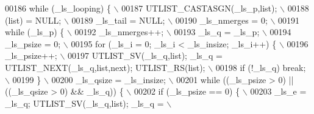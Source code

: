 \begin{DoxyCode}
00186 \textcolor{preprocessor}{    while (\_ls\_looping) \{                                                                      \(\backslash\)}
00187 \textcolor{preprocessor}{      UTLIST\_CASTASGN(\_ls\_p,list);                                                             \(\backslash\)}
00188 \textcolor{preprocessor}{      (list) = NULL;                                                                           \(\backslash\)}
00189 \textcolor{preprocessor}{      \_ls\_tail = NULL;                                                                         \(\backslash\)}
00190 \textcolor{preprocessor}{      \_ls\_nmerges = 0;                                                                         \(\backslash\)}
00191 \textcolor{preprocessor}{      while (\_ls\_p) \{                                                                          \(\backslash\)}
00192 \textcolor{preprocessor}{        \_ls\_nmerges++;                                                                         \(\backslash\)}
00193 \textcolor{preprocessor}{        \_ls\_q = \_ls\_p;                                                                         \(\backslash\)}
00194 \textcolor{preprocessor}{        \_ls\_psize = 0;                                                                         \(\backslash\)}
00195 \textcolor{preprocessor}{        for (\_ls\_i = 0; \_ls\_i < \_ls\_insize; \_ls\_i++) \{                                         \(\backslash\)}
00196 \textcolor{preprocessor}{          \_ls\_psize++;                                                                         \(\backslash\)}
00197 \textcolor{preprocessor}{          UTLIST\_SV(\_ls\_q,list); \_ls\_q = UTLIST\_NEXT(\_ls\_q,list,next); UTLIST\_RS(list);        \(\backslash\)}
00198 \textcolor{preprocessor}{          if (!\_ls\_q) break;                                                                   \(\backslash\)}
00199 \textcolor{preprocessor}{        \}                                                                                      \(\backslash\)}
00200 \textcolor{preprocessor}{        \_ls\_qsize = \_ls\_insize;                                                                \(\backslash\)}
00201 \textcolor{preprocessor}{        while ((\_ls\_psize > 0) || ((\_ls\_qsize > 0) && \_ls\_q)) \{                                \(\backslash\)}
00202 \textcolor{preprocessor}{          if (\_ls\_psize == 0) \{                                                                \(\backslash\)}
00203 \textcolor{preprocessor}{            \_ls\_e = \_ls\_q; UTLIST\_SV(\_ls\_q,list); \_ls\_q =                                      \(\backslash\)}

\end{DoxyCode}

